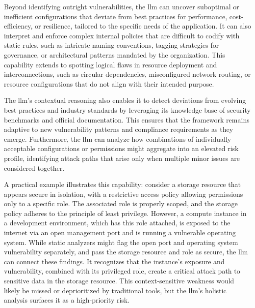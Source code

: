 Beyond identifying outright vulnerabilities, the \gls{llm} can uncover suboptimal or inefficient configurations that deviate from best practices for performance, cost-efficiency, or resilience, tailored to the specific needs of the application\cite{andrade_enhancing_2025-1}. It can also interpret and enforce complex internal policies that are difficult to codify with static rules, such as intricate naming conventions, tagging strategies for governance, or architectural patterns mandated by the organization\cite{li_iris_2025}. This capability extends to spotting logical flaws in resource deployment and interconnections, such as circular dependencies, misconfigured network routing, or resource configurations that do not align with their intended purpose\cite{li_iris_2025,andrade_enhancing_2025-1}.

The \gls{llm}’s contextual reasoning also enables it to detect deviations from evolving best practices and industry standards by leveraging its knowledge base of security benchmarks and official documentation. This ensures that the framework remains adaptive to new vulnerability patterns and compliance requirements as they emerge\cite{li_iris_2025,andrade_enhancing_2025-1}. Furthermore, the \gls{llm} can analyze how combinations of individually acceptable configurations or permissions might aggregate into an elevated risk profile, identifying attack paths that arise only when multiple minor issues are considered together\cite{andrade_enhancing_2025-1}.

A practical example illustrates this capability: consider a storage resource that appears secure in isolation, with a restrictive access policy allowing permissions only to a specific role. The associated role is properly scoped, and the storage policy adheres to the principle of least privilege. However, a compute instance in a development environment, which has this role attached, is exposed to the internet via an open management port and is running a vulnerable operating system\cite{andrade_enhancing_2025-1}. While static analyzers might flag the open port and operating system vulnerability separately, and pass the storage resource and role as secure, the \gls{llm} can connect these findings. It recognizes that the instance’s exposure and vulnerability, combined with its privileged role, create a critical attack path to sensitive data in the storage resource\cite{li_iris_2025}. This context-sensitive weakness would likely be missed or deprioritized by traditional tools, but the \gls{llm}’s holistic analysis surfaces it as a high-priority risk\cite{li_iris_2025,andrade_enhancing_2025-1}.

